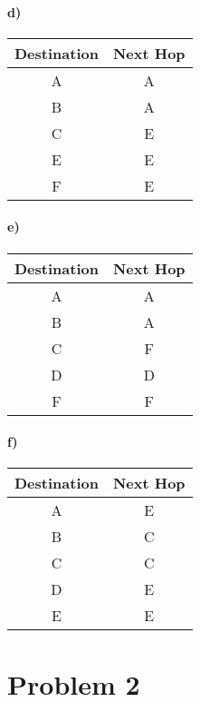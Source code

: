 \documentclass[12pt]{article}
\begin{document}
\paragraph{d)}

\begin{center}
    \begin{tabular}{c|c}
        Destination & Next Hop \\
        \hline
        A & A\\
        B & A\\
        C & E\\
        E & E\\
        F & E
    \end{tabular}
\end{center}

\paragraph{e)}

\begin{center}
    \begin{tabular}{c|c}
        Destination & Next Hop \\
        \hline
        A & A\\
        B & A\\
        C & F\\
        D & D\\
        F & F
    \end{tabular}
\end{center}

\paragraph{f)}

\begin{center}
    \begin{tabular}{c|c}
        Destination & Next Hop \\
        \hline
        A & E\\
        B & C\\
        C & C\\
        D & E\\
        E & E
    \end{tabular}
\end{center}

\section*{Problem 2}
\end{document}
